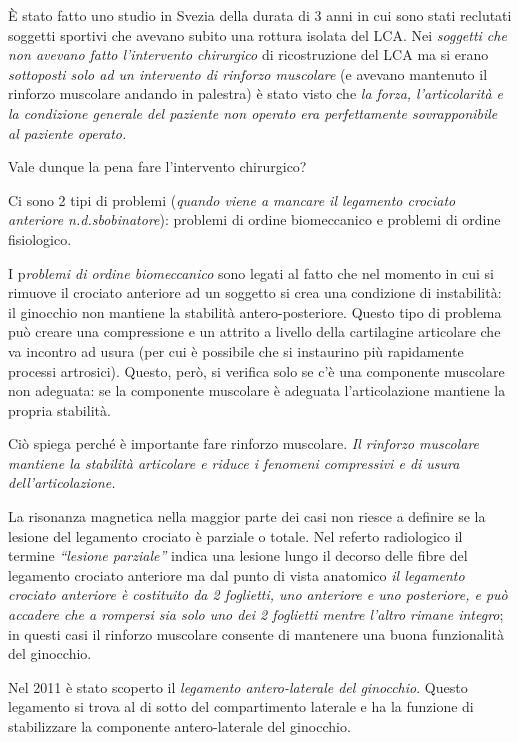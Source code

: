 \documentclass[]{article}
\begin{document}
È stato fatto uno studio in Svezia della durata di 3 anni in cui sono
stati reclutati soggetti sportivi che avevano subito una rottura isolata
del LCA. Nei \emph{soggetti che non avevano fatto l'intervento
chirurgico} di ricostruzione del LCA ma si erano \emph{sottoposti solo
ad un intervento di rinforzo muscolare} (e avevano mantenuto il rinforzo
muscolare andando in palestra) è stato visto che \emph{la forza,
l'articolarità e la condizione generale del paziente non operato era
perfettamente sovrapponibile al paziente operato. }

Vale dunque la pena fare l'intervento chirurgico?

Ci sono 2 tipi di problemi (\emph{quando viene a mancare il legamento
crociato anteriore n.d.sbobinatore}): problemi di ordine biomeccanico e
problemi di ordine fisiologico.

I p\emph{roblemi di ordine biomeccanico} sono legati al fatto che nel
momento in cui si rimuove il crociato anteriore ad un soggetto si crea
una condizione di instabilità: il ginocchio non mantiene la stabilità
antero-posteriore. Questo tipo di problema può creare una compressione e
un attrito a livello della cartilagine articolare che va incontro ad
usura (per cui è possibile che si instaurino più rapidamente processi
artrosici). Questo, però, si verifica solo se c'è una componente
muscolare non adeguata: se la componente muscolare è adeguata
l'articolazione mantiene la propria stabilità.

Ciò spiega perché è importante fare rinforzo muscolare. \emph{Il
rinforzo muscolare mantiene la stabilità articolare e riduce i fenomeni
compressivi e di usura dell'articolazione.}

La risonanza magnetica nella maggior parte dei casi non riesce a
definire se la lesione del legamento crociato è parziale o totale. Nel
referto radiologico il termine \emph{``lesione parziale''} indica una
lesione lungo il decorso delle fibre del legamento crociato anteriore ma
dal punto di vista anatomico \emph{il legamento crociato anteriore è
costituito da 2 foglietti, uno anteriore e uno posteriore, e può
accadere che a rompersi sia solo uno dei 2 foglietti mentre l'altro
rimane integro}; in questi casi il rinforzo muscolare consente di
mantenere una buona funzionalità del ginocchio.

Nel 2011 è stato scoperto il \emph{legamento antero-laterale del
ginocchio}. Questo legamento si trova al di sotto del compartimento
laterale e ha la funzione di stabilizzare la componente antero-laterale
del ginocchio.
\end{document}
